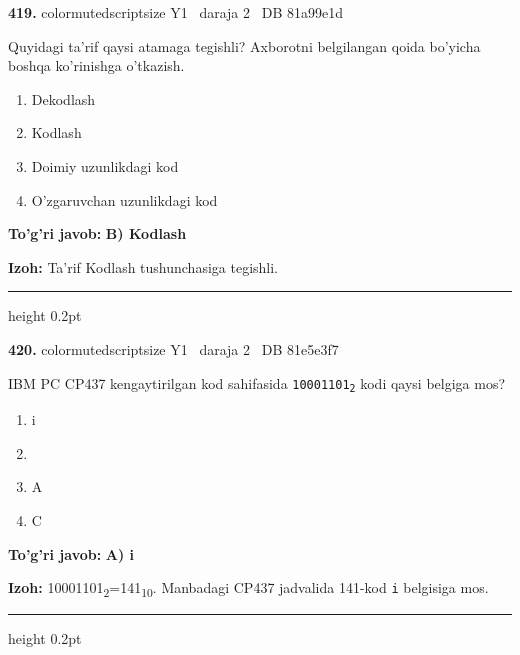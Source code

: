 \documentclass[10pt,a4paper,oneside]{article}
\begin{document}
\noindent\textbf{\color{ink}419.}  {color{muted}scriptsize Y1 \textbullet\ daraja 2 \textbullet\ DB 81a99e1d}
\par
Quyidagi ta'rif qaysi atamaga tegishli? Axborotni belgilangan qoida bo'yicha boshqa ko'rinishga o'tkazish.
\begin{enumerate}[label=\Alph*),leftmargin=9mm]
\item Dekodlash
\item Kodlash
\item Doimiy uzunlikdagi kod
\item O'zgaruvchan uzunlikdagi kod
\end{enumerate}
\begin{tcolorbox}[enhanced,breakable,colback=teal!4,colframe=teal!50!black,boxrule=0.5pt,arc=1.1mm,left=3mm,right=3mm,top=1.7mm,bottom=1.7mm,before skip=2mm,after skip=2mm]
\textbf{\color{teal}To'g'ri javob:} \textbf{B) Kodlash}
\par\smallskip
\textbf{Izoh:} Ta'rif Kodlash tushunchasiga tegishli.
\end{tcolorbox}
\vspace{2mm}\hrule height 0.2pt \vspace{3mm}

\noindent\textbf{\color{ink}420.}  {color{muted}scriptsize Y1 \textbullet\ daraja 2 \textbullet\ DB 81e5e3f7}
\par
IBM PC CP437 kengaytirilgan kod sahifasida \texttt{10001101\textsubscript{2}} kodi qaysi belgiga mos?
\begin{enumerate}[label=\Alph*),leftmargin=9mm]
\item i
\item \textcopyright{}
\item A
\item C
\end{enumerate}
\begin{tcolorbox}[enhanced,breakable,colback=teal!4,colframe=teal!50!black,boxrule=0.5pt,arc=1.1mm,left=3mm,right=3mm,top=1.7mm,bottom=1.7mm,before skip=2mm,after skip=2mm]
\textbf{\color{teal}To'g'ri javob:} \textbf{A) i}
\par\smallskip
\textbf{Izoh:} 10001101\textsubscript{2}=141\textsubscript{1}\textsubscript{0}. Manbadagi CP437 jadvalida 141-kod \texttt{i} belgisiga mos.
\end{tcolorbox}
\vspace{2mm}\hrule height 0.2pt \vspace{3mm}
\end{document}
